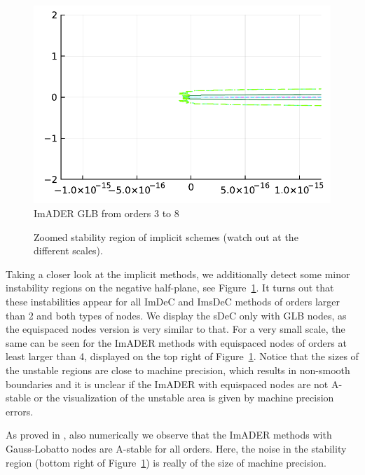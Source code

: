 \begin{figure}
\begin{minipage}[t]{0.325\textwidth}
		\includegraphics[width=\textwidth]{pdf/odepics/IMEXADER_gaussLobatto_zoom.pdf}
		\centering
		ImADER GLB from orders 3 to 8
	\end{minipage}
	\caption{Zoomed stability region of implicit schemes (watch out at the different scales).}
	\label{fig: ODE_minor_instabilitys}
\end{figure}

Taking a closer look at the implicit methods, we additionally detect some minor instability regions on the negative half-plane, see Figure~\ref{fig: ODE_minor_instabilitys}.
It turns out that these instabilities appear for all ImDeC and ImsDeC methods of orders larger than 2 and both types of nodes. We display the sDeC only with GLB nodes, as the equispaced nodes version is very similar to that.
For a very small scale, the same can be seen for the ImADER methods with equispaced nodes of orders at least larger than 4, displayed on the top right of Figure~\ref{fig: ODE_minor_instabilitys}. 
Notice that the sizes of the unstable regions are close to machine precision, which results in non-smooth boundaries and it is unclear if the ImADER with equispaced nodes are not A-stable or the visualization of the unstable area is given by machine precision errors.

As proved in \cite{petri2024analysis}, also numerically we observe that the ImADER methods with Gauss-Lobatto nodes are A-stable for all orders. Here, the noise in the stability region (bottom right of Figure~\ref{fig: ODE_minor_instabilitys}) is really of the size of machine precision.



